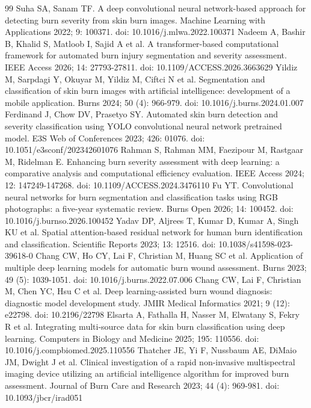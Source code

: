 \documentclass{elektr}
\begin{document}
\begin{thebibliography}{99}
 Suha SA, Sanam TF. A deep convolutional neural network-based approach for detecting burn severity from skin burn images. Machine Learning with Applications 2022; 9: 100371. doi: 10.1016/j.mlwa.2022.100371
 Nadeem A, Bashir B, Khalid S, Matloob I, Sajid A et al. A transformer-based computational framework for automated burn injury segmentation and severity assessment. IEEE Access 2026; 14: 27793-27811. doi: 10.1109/ACCESS.2026.3663629
 Yildiz M, Sarpdagi Y, Okuyar M, Yildiz M, Ciftci N et al. Segmentation and classification of skin burn images with artificial intelligence: development of a mobile application. Burns 2024; 50 (4): 966-979. doi: 10.1016/j.burns.2024.01.007
 Ferdinand J, Chow DV, Prasetyo SY. Automated skin burn detection and severity classification using YOLO convolutional neural network pretrained model. E3S Web of Conferences 2023; 426: 01076. doi: 10.1051/e3sconf/202342601076
 Rahman S, Rahman MM, Faezipour M, Rastgaar M, Ridelman E. Enhancing burn severity assessment with deep learning: a comparative analysis and computational efficiency evaluation. IEEE Access 2024; 12: 147249-147268. doi: 10.1109/ACCESS.2024.3476110
 Fu YT. Convolutional neural networks for burn segmentation and classification tasks using RGB photographs: a five-year systematic review. Burns Open 2026; 14: 100452. doi: 10.1016/j.burnso.2026.100452
 Yadav DP, Aljrees T, Kumar D, Kumar A, Singh KU et al. Spatial attention-based residual network for human burn identification and classification. Scientific Reports 2023; 13: 12516. doi: 10.1038/s41598-023-39618-0
 Chang CW, Ho CY, Lai F, Christian M, Huang SC et al. Application of multiple deep learning models for automatic burn wound assessment. Burns 2023; 49 (5): 1039-1051. doi: 10.1016/j.burns.2022.07.006
 Chang CW, Lai F, Christian M, Chen YC, Hsu C et al. Deep learning-assisted burn wound diagnosis: diagnostic model development study. JMIR Medical Informatics 2021; 9 (12): e22798. doi: 10.2196/22798
 Elsarta A, Fathalla H, Nasser M, Elwatany S, Fekry R et al. Integrating multi-source data for skin burn classification using deep learning. Computers in Biology and Medicine 2025; 195: 110556. doi: 10.1016/j.compbiomed.2025.110556
 Thatcher JE, Yi F, Nussbaum AE, DiMaio JM, Dwight J et al. Clinical investigation of a rapid non-invasive multispectral imaging device utilizing an artificial intelligence algorithm for improved burn assessment. Journal of Burn Care and Research 2023; 44 (4): 969-981. doi: 10.1093/jbcr/irad051

\end{thebibliography}
\end{document}
